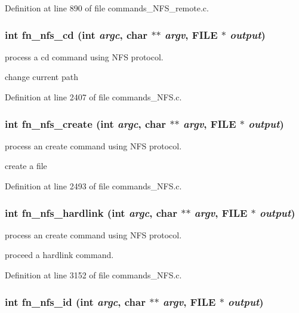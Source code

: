 Definition at line 890 of file commands\_\-NFS\_\-remote.c.
\subsubsection[{fn\_\-nfs\_\-cd}]{\setlength{\rightskip}{0pt plus 5cm}int fn\_\-nfs\_\-cd (int {\em argc}, \/  char $\ast$$\ast$ {\em argv}, \/  FILE $\ast$ {\em output})}\label{commands_8h_a0d725e646fab51fc0eb5560df33bc1a0}
process a cd command using NFS protocol.

change current path 

Definition at line 2407 of file commands\_\-NFS.c.
\subsubsection[{fn\_\-nfs\_\-create}]{\setlength{\rightskip}{0pt plus 5cm}int fn\_\-nfs\_\-create (int {\em argc}, \/  char $\ast$$\ast$ {\em argv}, \/  FILE $\ast$ {\em output})}\label{commands_8h_a2afba74460f41057660fe0e4837af49f}
process an create command using NFS protocol.

create a file 

Definition at line 2493 of file commands\_\-NFS.c.
\subsubsection[{fn\_\-nfs\_\-hardlink}]{\setlength{\rightskip}{0pt plus 5cm}int fn\_\-nfs\_\-hardlink (int {\em argc}, \/  char $\ast$$\ast$ {\em argv}, \/  FILE $\ast$ {\em output})}\label{commands_8h_ac99922021c335b7fba99edb49a2c096c}
process an create command using NFS protocol.

proceed a hardlink command. 

Definition at line 3152 of file commands\_\-NFS.c.
\subsubsection[{fn\_\-nfs\_\-id}]{\setlength{\rightskip}{0pt plus 5cm}int fn\_\-nfs\_\-id (int {\em argc}, \/  char $\ast$$\ast$ {\em argv}, \/  FILE $\ast$ {\em output})}\label{commands_8h_ae82413f9ea4aee4e5004e68864d9d9e0}


